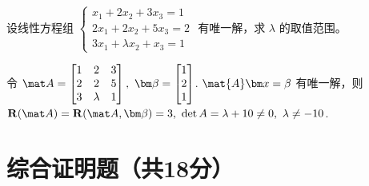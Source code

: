 \begin{problem}[本题7分]
  设线性方程组
  $\begin{cases}
    x_1  + 2x_2        + 3x_3 = 1\\
    2x_1 + 2x_2        + 5x_3 = 2\\
    3x_1 + \lambda x_2 + x_3  = 1
  \end{cases}$
  有唯一解，求 $\lambda$ 的取值范围。
\end{problem}
\scratch[2ex]
\begin{solution}
  令 $\mat A =
  \begin{bmatrix}
    1 & 2       & 3\\
    2 & 2       & 5\\
    3 & \lambda & 1
  \end{bmatrix},~
  \bm\beta =
  \begin{bmatrix}
    1\\ 2\\ 1
  \end{bmatrix}$. $\mat{A}\bm x = \beta$ 有唯一解，则
  $\mathbf R(\mat A) = \mathbf R(\mat A,\bm\beta) = 3,~
    \det A = \lambda + 10\neq 0,~ \lambda \neq -10$.
\end{solution}

\section{综合证明题（共18分）}

